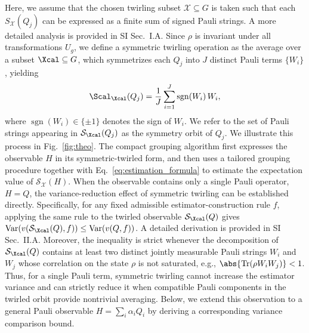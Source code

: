 \documentclass[prl,aps,twocolumn,notitlepage,superscriptaddress,showpacs,nofootinbib]{revtex4-2}
\newcommand{\red}[1]{{\color{red} #1}}
\begin{document}

\red{Here, we assume that the chosen
twirling subset $\mathcal{X}\subseteq G$ is taken such that each $S_{\mathcal{X}}(Q_j)$ can be expressed as a finite sum of signed
Pauli strings. A more detailed analysis is provided in SI Sec.~I.A.} Since $\rho$ is invariant under all transformations $U_g$, we define a symmetric twirling operation as the average over a subset $\Xcal \subseteq G$, which symmetrizes each $Q_j$ into \red{$J$ distinct Pauli terms $\{W_i\}$, yielding}
\begin{equation}
    \Scal_{\Xcal}(Q_j) = \frac{1}{J}\sum_{i=1}^J \operatorname{sgn}(W_i)\,W_i,
\end{equation}
\red{where $\operatorname{sgn}(W_i) \in \{\pm 1\}$ denotes the sign of $W_i$. We refer to the set of Pauli strings appearing in 
\(\mathcal S_{\Xcal}(Q_j)\) as the symmetry orbit of \(Q_j\).} We illustrate this process in Fig.~\ref{fig:theo}. The compact grouping algorithm first expresses the observable $H$ in its symmetric-twirled form, and then uses a tailored grouping procedure together with Eq.~\eqref{eq:estimation_formula} to estimate the expectation value of $\mathcal{S}_{\mathcal{X}}(H)$.
\red{When the observable contains only a single Pauli operator, $H=Q$, the variance-reduction effect of symmetric twirling can be established directly. 
Specifically, for any fixed admissible estimator-construction rule $f$, applying the same rule to the twirled observable $\mathcal S_{\Xcal}(Q)$ gives $\mathrm{Var}\!\left(v(\mathcal S_{\Xcal}(Q),f)\right)\leq \mathrm{Var}\!\left(v(Q,f)\right)$. 
A detailed derivation is provided in SI Sec.~II.A.
Moreover, the inequality is strict whenever the decomposition of $\mathcal S_{\Xcal}(Q)$ contains at least two distinct jointly measurable Pauli strings $W_i$ and $W_j$ whose correlation on the state $\rho$ is not saturated, e.g., $\abs{\operatorname{Tr}(\rho W_iW_j)}<1$. 
Thus, for a single Pauli term, symmetric twirling cannot increase the estimator variance and can strictly reduce it when compatible Pauli components in the twirled orbit provide nontrivial averaging. 
Below, we extend this observation to a general Pauli observable $H=\sum_i \alpha_i Q_i$ by deriving a corresponding variance comparison bound.} 
\end{document}
